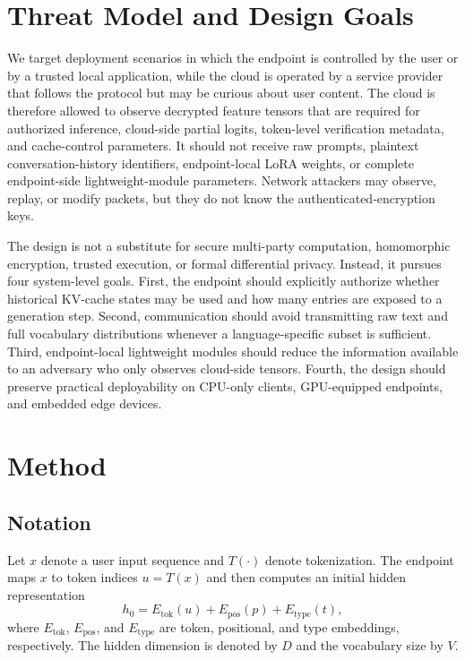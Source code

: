 \documentclass{article}
\begin{document}
\section{Threat Model and Design Goals}
\label{sec:threat}

We target deployment scenarios in which the endpoint is controlled by the user or by a trusted local application, while the cloud is operated by a service provider that follows the protocol but may be curious about user content. The cloud is therefore allowed to observe decrypted feature tensors that are required for authorized inference, cloud-side partial logits, token-level verification metadata, and cache-control parameters. It should not receive raw prompts, plaintext conversation-history identifiers, endpoint-local LoRA weights, or complete endpoint-side lightweight-module parameters. Network attackers may observe, replay, or modify packets, but they do not know the authenticated-encryption keys.

The design is not a substitute for secure multi-party computation, homomorphic encryption, trusted execution, or formal differential privacy. Instead, it pursues four system-level goals. First, the endpoint should explicitly authorize whether historical KV-cache states may be used and how many entries are exposed to a generation step. Second, communication should avoid transmitting raw text and full vocabulary distributions whenever a language-specific subset is sufficient. Third, endpoint-local lightweight modules should reduce the information available to an adversary who only observes cloud-side tensors. Fourth, the design should preserve practical deployability on CPU-only clients, GPU-equipped endpoints, and embedded edge devices.

\section{Method}

\subsection{Notation}

Let $x$ denote a user input sequence and $T(\cdot)$ denote tokenization. The endpoint maps $x$ to token indices $u=T(x)$ and then computes an initial hidden representation
\begin{equation}
  h_0 = E_{\mathrm{tok}}(u) + E_{\mathrm{pos}}(p) + E_{\mathrm{type}}(t),
\end{equation}
where $E_{\mathrm{tok}}$, $E_{\mathrm{pos}}$, and $E_{\mathrm{type}}$ are token, positional, and type embeddings, respectively. The hidden dimension is denoted by $D$ and the vocabulary size by $V$.
\end{document}
